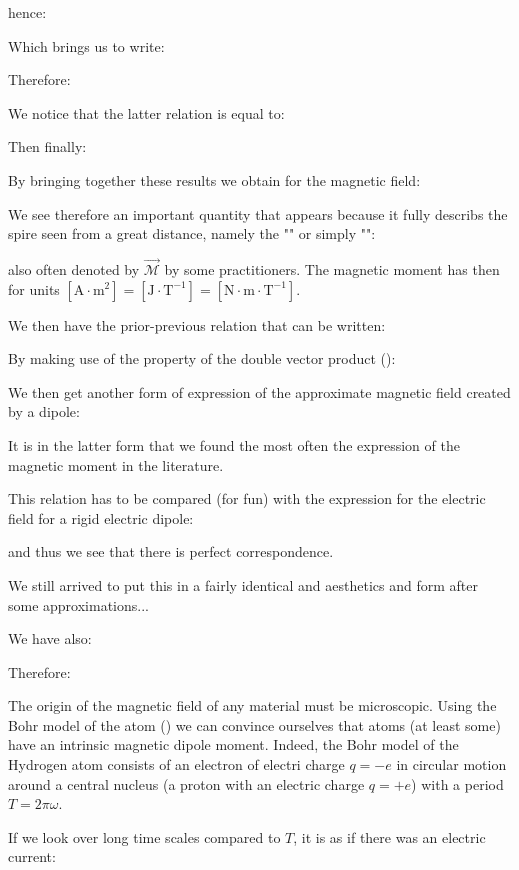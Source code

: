 	hence:
	
	Which brings us to write:
	
	Therefore:
	
	We notice that the latter relation is equal to:
	
	Then finally:
	
	By bringing together these results we obtain for the magnetic field:
	
	We see therefore an important quantity that appears because it fully describs the spire seen from a great distance, namely the "" or simply "":
	
	also often denoted by $\vec{\mathcal{M}}$ by some practitioners. The magnetic moment has then for units $[\text{A}\cdot\text{m}^2]=[\text{J}\cdot\text{T}^{-1}]=[\text{N}\cdot\text{m}\cdot \text{T}^{-1}]$. 
	
	We then have the prior-previous relation that can be written:
	
	By making use of the property of the double vector product ():
	
	We then get another form of expression of the approximate magnetic field created by a dipole:
	
	It is in the latter form that we found the most often the expression of the magnetic moment in the literature.
	
	This relation has to be compared (for fun) with the expression for the electric field for a rigid electric dipole:
	
	and thus we see that there is perfect correspondence.
	
	We still arrived to put this in a fairly identical and aesthetics and form after some approximations...

	We have also:
	
	Therefore:
	
	The origin of the magnetic field of any material must be microscopic. Using the Bohr model of the atom () we can convince ourselves that atoms (at least some) have an intrinsic magnetic dipole moment. Indeed, the Bohr model of the Hydrogen atom consists of an electron of electri charge $q=-e$ in circular motion around a central nucleus (a proton with an electric charge $q=+e$) with a period $T=2\pi\omega$.
	
	If we look over long time scales compared to $T$, it is as if there was an electric current:
	
